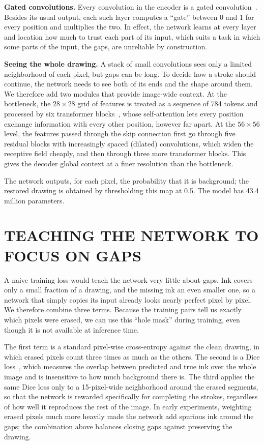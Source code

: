 \documentclass{IEEEcsmag}
\begin{document}
\textbf{Gated convolutions.} Every convolution in the encoder is a gated
convolution~\cite{yu2019gatedconv}. Besides its usual output, each such layer
computes a ``gate'' between 0 and 1 for every position and multiplies the two. In
effect, the network learns at every layer and location how much to trust each part
of its input, which suits a task in which some parts of the input, the gaps, are
unreliable by construction.

\textbf{Seeing the whole drawing.} A stack of small convolutions sees only a limited
neighborhood of each pixel, but gaps can be long. To decide how a stroke should
continue, the network needs to see both of its ends and the shape around them. We
therefore add two modules that provide image-wide context. At the bottleneck, the
$28\times 28$ grid of features is treated as a sequence of 784 tokens and processed
by six transformer blocks~\cite{vaswani2017attention}, whose self-attention lets every
position exchange information with every other position, however far apart. At the
$56\times 56$ level, the features passed through the skip connection first go through
five residual blocks with increasingly spaced (dilated) convolutions, which widen the
receptive field cheaply, and then through three more transformer blocks. This gives
the decoder global context at a finer resolution than the bottleneck.

The network outputs, for each pixel, the probability that it is background; the
restored drawing is obtained by thresholding this map at 0.5. The model has 43.4
million parameters.

\section{TEACHING THE NETWORK TO FOCUS ON GAPS}

A naive training loss would teach the network very little about gaps. Ink covers only
a small fraction of a drawing, and the missing ink an even smaller one, so a network
that simply copies its input already looks nearly perfect pixel by pixel. We
therefore combine three terms. Because the training pairs tell us exactly which
pixels were erased, we can use this ``hole mask'' during training, even though it is
not available at inference time.

The first term is a standard pixel-wise cross-entropy against the clean drawing, in
which erased pixels count three times as much as the others. The second is a Dice
loss~\cite{milletari2016vnet}, which measures the overlap between predicted and true
ink over the whole image and is insensitive to how much background there is. The
third applies the same Dice loss only to a 15-pixel-wide neighborhood around the
erased segments, so that the network is rewarded specifically for completing the
strokes, regardless of how well it reproduces the rest of the image. In early
experiments, weighting erased pixels much more heavily made the network add spurious
ink around the gaps; the combination above balances closing gaps against preserving
the drawing.
\end{document}
